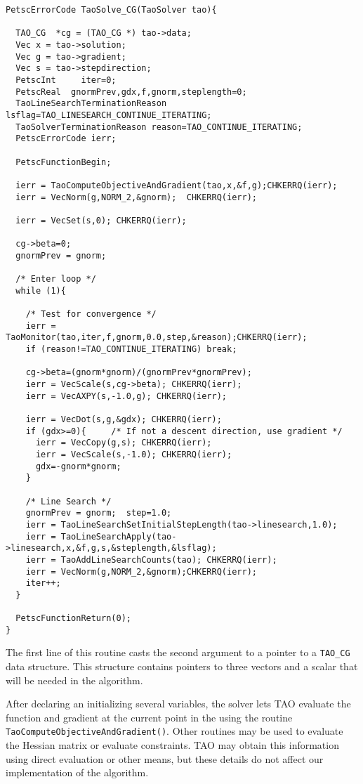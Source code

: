 \begin{verbatim}
PetscErrorCode TaoSolve_CG(TaoSolver tao){

  TAO_CG  *cg = (TAO_CG *) tao->data;
  Vec x = tao->solution;
  Vec g = tao->gradient;
  Vec s = tao->stepdirection;
  PetscInt     iter=0;
  PetscReal  gnormPrev,gdx,f,gnorm,steplength=0;
  TaoLineSearchTerminationReason lsflag=TAO_LINESEARCH_CONTINUE_ITERATING;
  TaoSolverTerminationReason reason=TAO_CONTINUE_ITERATING;
  PetscErrorCode ierr;

  PetscFunctionBegin;

  ierr = TaoComputeObjectiveAndGradient(tao,x,&f,g);CHKERRQ(ierr);
  ierr = VecNorm(g,NORM_2,&gnorm);  CHKERRQ(ierr);

  ierr = VecSet(s,0); CHKERRQ(ierr); 

  cg->beta=0;
  gnormPrev = gnorm;

  /* Enter loop */
  while (1){

    /* Test for convergence */
    ierr = TaoMonitor(tao,iter,f,gnorm,0.0,step,&reason);CHKERRQ(ierr);
    if (reason!=TAO_CONTINUE_ITERATING) break;

    cg->beta=(gnorm*gnorm)/(gnormPrev*gnormPrev);
    ierr = VecScale(s,cg->beta); CHKERRQ(ierr);
    ierr = VecAXPY(s,-1.0,g); CHKERRQ(ierr);
    
    ierr = VecDot(s,g,&gdx); CHKERRQ(ierr);
    if (gdx>=0){     /* If not a descent direction, use gradient */
      ierr = VecCopy(g,s); CHKERRQ(ierr);
      ierr = VecScale(s,-1.0); CHKERRQ(ierr);
      gdx=-gnorm*gnorm;
    } 

    /* Line Search */
    gnormPrev = gnorm;  step=1.0;
    ierr = TaoLineSearchSetInitialStepLength(tao->linesearch,1.0);
    ierr = TaoLineSearchApply(tao->linesearch,x,&f,g,s,&steplength,&lsflag);
    ierr = TaoAddLineSearchCounts(tao); CHKERRQ(ierr);
    ierr = VecNorm(g,NORM_2,&gnorm);CHKERRQ(ierr);
    iter++;
  }
  
  PetscFunctionReturn(0);
}
\end{verbatim}

The first line of this routine casts the second argument to a pointer
to a {\tt TAO\_CG} data structure.  This structure contains pointers
to three vectors and a scalar that will be needed in the algorithm.

After declaring an initializing several variables, the solver lets TAO 
evaluate the function and gradient at the
current point in the using the routine 
{\tt Tao\-Compute\-Objective\-And\-Gradient()}.
Other routines may be used to evaluate the Hessian matrix or evaluate
constraints.  TAO may obtain this information using direct evaluation 
or other means, but these details do not affect our implementation
of the algorithm.

